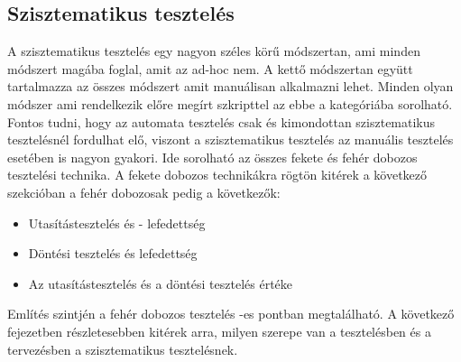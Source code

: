 \subsection{Szisztematikus tesztelés} A szisztematikus tesztelés egy nagyon széles körű módszertan, ami minden módszert magába foglal, amit az ad-hoc nem. A kettő módszertan együtt tartalmazza az összes módszert amit manuálisan alkalmazni lehet. Minden olyan módszer ami rendelkezik előre megírt szkripttel az ebbe a kategóriába sorolható. Fontos tudni, hogy az automata tesztelés csak és kimondottan szisztematikus tesztelésnél fordulhat elő, viszont a szisztematikus tesztelés az manuális tesztelés esetében is nagyon gyakori. Ide sorolható az összes fekete és fehér dobozos tesztelési technika. A fekete dobozos technikákra rögtön kitérek a következő szekcióban a fehér dobozosak pedig a következők:
\begin{itemize}
\item Utasítástesztelés és - lefedettség
\item Döntési tesztelés és lefedettség
\item Az utasítástesztelés és a döntési tesztelés értéke
\end{itemize}
Említés szintjén a fehér dobozos tesztelés -es pontban megtalálható.
\label{tab:sziszt}
A következő fejezetben részletesebben kitérek arra, milyen szerepe van a tesztelésben és a tervezésben a szisztematikus tesztelésnek.

